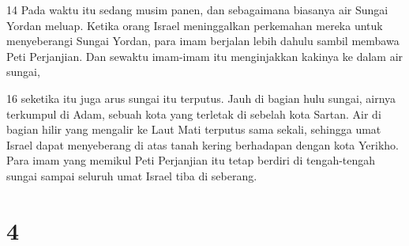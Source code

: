 \par 14 Pada waktu itu sedang musim panen, dan sebagaimana biasanya air Sungai Yordan meluap. Ketika orang Israel meninggalkan perkemahan mereka untuk menyeberangi Sungai Yordan, para imam berjalan lebih dahulu sambil membawa Peti Perjanjian. Dan sewaktu imam-imam itu menginjakkan kakinya ke dalam air sungai,
\par 16 seketika itu juga arus sungai itu terputus. Jauh di bagian hulu sungai, airnya terkumpul di Adam, sebuah kota yang terletak di sebelah kota Sartan. Air di bagian hilir yang mengalir ke Laut Mati terputus sama sekali, sehingga umat Israel dapat menyeberang di atas tanah kering berhadapan dengan kota Yerikho. Para imam yang memikul Peti Perjanjian itu tetap berdiri di tengah-tengah sungai sampai seluruh umat Israel tiba di seberang.

\chapter{4}

